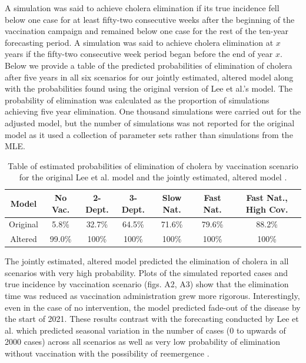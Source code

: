 \documentclass[12pt]{article}
\begin{document}
  A simulation was said to achieve cholera elimination if its true incidence fell below one case for at least fifty-two consecutive weeks after the beginning of the vaccination campaign and remained below one case for the rest of the ten-year forecasting period. A simulation was said to achieve cholera elimination at $x$ years if the fifty-two consecutive week period began before the end of year $x$. Below we provide a table of the predicted probabilities of elimination of cholera after five years in all six scenarios for our jointly estimated, altered model along with the probabilities found using the original version of Lee et al.'s model. The probability of elimination was calculated as the proportion of simulations achieving five year elimination. One thousand simulations were carried out for the adjusted model, but the number of simulations was not reported for the original model as it used a collection of parameter sets rather than simulations from the MLE.
        \begin{table}[H]
        \caption{Table of estimated probabilities of elimination of cholera by vaccination scenario for the original Lee et al. model and the jointly estimated, altered model \cite{Lee_supp}.}
        \begin{center}
        \begin{tabular}{||c | c c c c c c ||}
         \hline
         Model & No Vac. & 2-Dept. & 3-Dept. & Slow Nat. & Fast Nat. & Fast Nat., High Cov. \\ [0.5ex]
         \hline\hline
         Original & 5.8\% & 32.7\% & 64.5\% & 71.6\% & 79.6\% & 88.2\% \\
         \hline
         Altered & 99.0\% & 100\% & 100\% & 100\% & 100\% & 100\% \\
         \hline
        \end{tabular}
        \end{center}
        \end{table}
        
  The jointly estimated, altered model predicted the elimination of cholera in all scenarios with very high probability. Plots of the simulated reported cases and true incidence by vaccination scenario (figs. A2, A3) show that the elimination time was reduced as vaccination administration grew more rigorous. Interestingly, even in the case of no intervention, the model predicted fade-out of the disease by the start of 2021. These results contrast with the forecasting conducted by Lee et al. which predicted seasonal variation in the number of cases (0 to upwards of 2000 cases) across all scenarios as well as very low probability of elimination without vaccination with the possibility of reemergence \cite{Lee_supp}.
\end{document}

